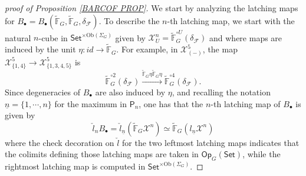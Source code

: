 \documentclass[a4paper,10pt
,draft
]{article}%
\numberwithin{equation}{section}
\numberwithin{figure}{section}
\theoremstyle{definition} %
\newcommand{\1}{\ensuremath{\mathbbm 1}}%
\begin{document}
\begin{proof}[proof of Proposition \ref{BARCOF PROP}]
We start by analyzing the latching maps
for 
$B_{\bullet}
=
B_{\bullet}(\widetilde{\mathbb{F}}_G,
\widetilde{\mathbb{F}}_G,
\delta_{\mathcal{F}})
$.
To describe the $n$-th latching map, we start with the natural $n$-cube in 
$\mathsf{Set}^{\times \text{Ob}(\Sigma_G)}$ 
given by
$\mathcal{X}^n_U = 
\widetilde{\mathbb{F}}_G^{\circ U}
(\delta_{\mathcal{F}})$
and where maps 
are induced by the unit
$\eta \colon id \to \widetilde{\mathbb{F}}_G$.
For example, in 
$\mathcal{X}^5_{(\minus)}$,
the map 
$\mathcal{X}^5_{\{1,4\}} \to \mathcal{X}^5_{\{1,3,4,5\}}$
is 
\[
\widetilde{\mathbb{F}}_G^{\circ 2}
(\delta_{\mathcal{F}})
\xrightarrow{
\widetilde{\mathbb{F}}_G
\eta
\widetilde{\mathbb{F}}_G
\eta}
\widetilde{\mathbb{F}}_G^{\circ 4}
(\delta_{\mathcal{F}}).
\]
Since degeneracies of $B_{\bullet}$
are also induced by $\eta$,
and recalling the notation $\underline{n}=\{1,\cdots,n\}$ for the maximum in $\mathsf{P}_n$,
one has that the $n$-th latching map of $B_{\bullet}$ is given by
\begin{equation}\label{MONLATCH EQ}
	\check{l}_n B_{\bullet} = 
	\check{l}_{\underline{n}}
	(\widetilde{\mathbb{F}}_G
	\mathcal{X}^n) \simeq
	\widetilde{\mathbb{F}}_G
	(l_{\underline{n}} \mathcal{X}^n)
\end{equation}
where the check decoration on $\check{l}$
for the two leftmost latching maps indicates that the colimits defining those latching maps are taken 
in $\mathsf{Op}_{G}(\mathsf{Set})$, while the rightmost latching map is computed in 
$\mathsf{Set}^{\times \text{Ob}(\Sigma_G)}$.


\end{proof}
\end{document}
